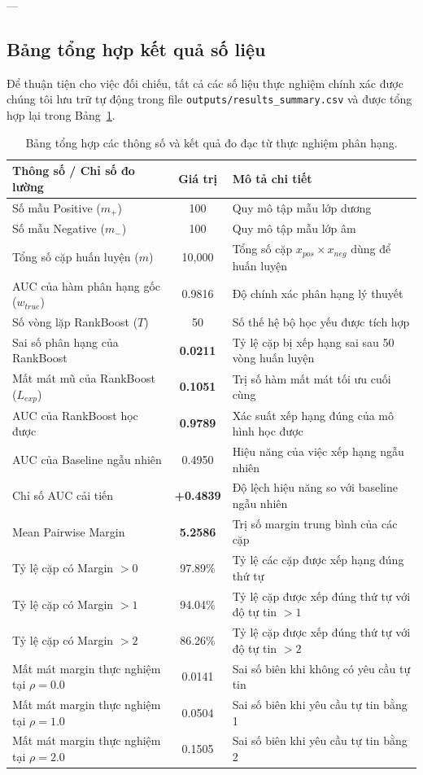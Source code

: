 ---

\subsection{Bảng tổng hợp kết quả số liệu}
Để thuận tiện cho việc đối chiếu, tất cả các số liệu thực nghiệm chính xác được chúng tôi lưu trữ tự động trong file \texttt{outputs/results_summary.csv} và được tổng hợp lại trong Bảng~\ref{tab:results_summary}.

\begin{table}[htbp]
    \centering
    \caption{Bảng tổng hợp các thông số và kết quả đo đạc từ thực nghiệm phân hạng.}
    \label{tab:results_summary}
    \begin{tabular}{lcp{8cm}}
        \hline
        \textbf{Thông số / Chỉ số đo lường} & \textbf{Giá trị} & \textbf{Mô tả chi tiết} \\
        \hline
        Số mẫu Positive ($m_+$) & 100 & Quy mô tập mẫu lớp dương \\
        Số mẫu Negative ($m_-$) & 100 & Quy mô tập mẫu lớp âm \\
        Tổng số cặp huấn luyện ($m$) & 10,000 & Tổng số cặp $x_{pos} \times x_{neg}$ dùng để huấn luyện \\
        AUC của hàm phân hạng gốc ($w_{true}$) & 0.9816 & Độ chính xác phân hạng lý thuyết \\
        Số vòng lặp RankBoost ($T$) & 50 & Số thế hệ bộ học yếu được tích hợp \\
        Sai số phân hạng của RankBoost & \textbf{0.0211} & Tỷ lệ cặp bị xếp hạng sai sau 50 vòng huấn luyện \\
        Mất mát mũ của RankBoost ($L_{exp}$) & \textbf{0.1051} & Trị số hàm mất mát tối ưu cuối cùng \\
        AUC của RankBoost học được & \textbf{0.9789} & Xác suất xếp hạng đúng của mô hình học được \\
        AUC của Baseline ngẫu nhiên & 0.4950 & Hiệu năng của việc xếp hạng ngẫu nhiên \\
        Chỉ số AUC cải tiến & \textbf{+0.4839} & Độ lệch hiệu năng so với baseline ngẫu nhiên \\
        Mean Pairwise Margin & \textbf{5.2586} & Trị số margin trung bình của các cặp \\
        Tỷ lệ cặp có Margin $> 0$ & 97.89\% & Tỷ lệ các cặp được xếp hạng đúng thứ tự \\
        Tỷ lệ cặp có Margin $> 1$ & 94.04\% & Tỷ lệ cặp được xếp đúng thứ tự với độ tự tin $> 1$ \\
        Tỷ lệ cặp có Margin $> 2$ & 86.26\% & Tỷ lệ cặp được xếp đúng thứ tự với độ tự tin $> 2$ \\
        Mất mát margin thực nghiệm tại $\rho=0.0$ & 0.0141 & Sai số biên khi không có yêu cầu tự tin \\
        Mất mát margin thực nghiệm tại $\rho=1.0$ & 0.0504 & Sai số biên khi yêu cầu tự tin bằng 1 \\
        Mất mát margin thực nghiệm tại $\rho=2.0$ & 0.1505 & Sai số biên khi yêu cầu tự tin bằng 2 \\
        \hline
    \end{tabular}
\end{table}
